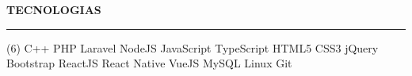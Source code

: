 \documentclass[a4paper,10pt]{article}
\newcommand{\SectionTitle}[1]{
    \begin{flushleft}
    \textbf{#1}
    \noindent\textcolor{gray}{\rule{18.5cm}{1px}}
    \end{flushleft}
}
\begin{document}
\SectionTitle
    {TECNOLOGIAS}
\begin{tasks}[style=itemize, column-sep=-13mm, label-align=left, label-offset={0mm}](6)%
\task C++
\task PHP
\task Laravel
\task NodeJS
\task JavaScript
\task TypeScript
\task HTML5
\task CSS3
\task jQuery
\task Bootstrap
\task ReactJS
\task React Native
\task VueJS
\task MySQL
\task Linux
\task Git
\end{tasks}
\end{document}
